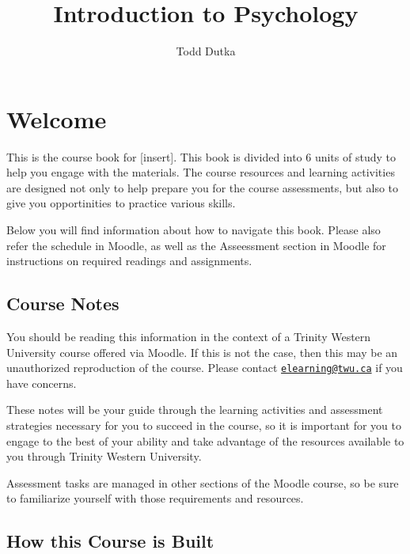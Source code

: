 \documentclass[
]{book}
\title{Introduction to Psychology}
\author{Todd Dutka}
\date{}
\begin{document}
\maketitle

{
\setcounter{tocdepth}{1}
\tableofcontents
}
\hypertarget{welcome}{%
\chapter*{Welcome}\label{welcome}}

This is the course book for {[}insert{]}. This book is divided into 6 units of study to help you engage with the materials. The course resources and learning activities are designed not only to help prepare you for the course assessments, but also to give you opportinities to practice various skills.

Below you will find information about how to navigate this book. Please also refer the schedule in Moodle, as well as the Asseessment section in Moodle for instructions on required readings and assignments.

\hypertarget{course-notes}{%
\section*{Course Notes}\label{course-notes}}

You should be reading this information in the context of a Trinity Western University course offered via Moodle. If this is not the case, then this may be an unauthorized reproduction of the course. Please contact \href{mailto:elearning@twu.ca}{\nolinkurl{elearning@twu.ca}} if you have concerns.

These notes will be your guide through the learning activities and assessment strategies necessary for you to succeed in the course, so it is important for you to engage to the best of your ability and take advantage of the resources available to you through Trinity Western University.

Assessment tasks are managed in other sections of the Moodle course, so be sure to familiarize yourself with those requirements and resources.

\hypertarget{how-this-course-is-built}{%
\section*{How this Course is Built}\label{how-this-course-is-built}}
\end{document}
